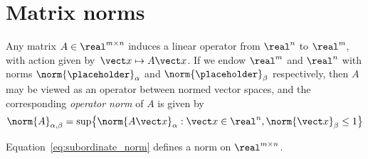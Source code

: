 \section{Matrix norms}%
\label{sec:matrix_norms}

Any matrix $A \in \real^{m \times n}$ induces a linear operator from $\real^n$ to $\real^m$,
with action given by~$\vect x \mapsto A \vect x$.
If we endow $\real^m$ and $\real^n$ with norms $\norm{\placeholder}_{\alpha}$ and $\norm{\placeholder}_{\beta}$ respectively,
then $A$ may be viewed as an operator between normed vector spaces,
and the corresponding \emph{operator norm} of $A$ is given by
\begin{equation}
    \label{eq:subordinate_norm}
    \norm{A}_{\alpha,\beta} = \sup \bigl\{ \norm{A \vect x}_{\alpha} : \vect x \in \real^n, \norm{\vect x}_{\beta} \leq 1 \bigr\}
\end{equation}
\begin{proposition}
    Equation~\eqref{eq:subordinate_norm} defines a norm on $\real^{m \times n}$.
\end{proposition}
